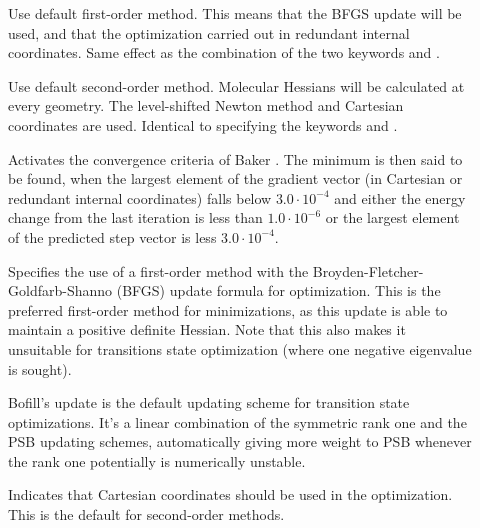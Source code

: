 \begin{description}

\item[]
Use default first-order method. This
means that the BFGS update will
be used, and that the optimization carried out in redundant internal
coordinates. Same effect as the
combination of the two keywords  and .

\item[]
Use default second-order method. Molecular Hessians will be calculated at every
geometry. The level-shifted Newton method and
Cartesian coordinates are used. Identical
to specifying the keywords  and .

\item[]
Activates the convergence criteria of Baker \cite{Baker}. The minimum
is then said to be found, when the largest element of the gradient
vector (in Cartesian or redundant internal coordinates) falls below
$3.0\cdot 10^{-4}$ and either the energy change from the last
iteration is less than $1.0\cdot 10^{-6}$ or the largest element of
the predicted step vector is less $3.0\cdot 10^{-4}$.

\item[]
Specifies the use of a first-order method with the Broyden-Fletcher-Goldfarb-Shanno (BFGS)
update formula for optimization. This is the
preferred first-order method for minimizations, as this update is able
to maintain a positive definite Hessian. Note that this also makes it
unsuitable for transitions state optimization (where one negative
eigenvalue is sought).


\item[]
Bofill's update\cite{jmbjcc15} is the default updating scheme for
transition state optimizations. It's a linear combination of the
symmetric rank one and the PSB updating schemes, automatically giving
more weight to PSB whenever the rank one potentially is numerically
unstable.

\item[]
Indicates that Cartesian coordinates should be used in the
optimization. This is the default for second-order methods.


\end{description}

